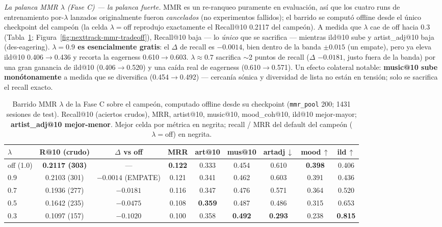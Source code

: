 \documentclass[11pt]{article}
\newcommand{\best}[1]{\textbf{#1}}
\begin{document}
\emph{La palanca MMR $\lambda$ (Fase C) --- la palanca fuerte.} MMR es un re-ranqueo
puramente en evaluación, así que los cuatro runs de entrenamiento por-$\lambda$
lanzados originalmente fueron \emph{cancelados} (no experimentos fallidos); el barrido
se computó offline desde el único checkpoint del campeón (la celda $\lambda{=}$off
reprodujo exactamente el Recall@10 \num{0.2117} del campeón). A medida que $\lambda$ cae
de off hacia \num{0.3} (Tabla~\ref{tab:mmr-sweep}; Figura~\ref{fig:nexttrack-mmr-tradeoff}),
Recall@10 baja --- lo \emph{único} que se sacrifica --- mientras ild@10 sube y
artist\_adj@10 baja (des-eagering). \textbf{$\lambda{=}\num{0.9}$ es esencialmente
gratis}: el $\Delta$ de recall es $-\num{0.0014}$, bien dentro de la banda
$\pm\num{0.015}$ (un empate), pero ya eleva ild@10 \num{0.406}$\to$\num{0.436} y recorta
la eagerness \num{0.610}$\to$\num{0.603}. \textbf{$\lambda\approx\num{0.7}$} sacrifica
$\sim$2 puntos de recall ($\Delta$ $-\num{0.0181}$, justo fuera de la banda) por una
gran ganancia de ild@10 (\num{0.406}$\to$\num{0.520}) y una caída real de eagerness
(\num{0.610}$\to$\num{0.571}). Un efecto colateral notable: \textbf{music@10 sube
monótonamente} a medida que se diversifica (\num{0.454}$\to$\num{0.492}) --- cercanía
sónica y diversidad de lista no están en tensión; solo se sacrifica el recall exacto.

\begin{table}[ht]
  \centering
  \caption{Barrido MMR $\lambda$ de la Fase C sobre el campeón, computado offline desde
  su checkpoint (\texttt{mmr\_pool} \num{200}; \num{1431} sesiones de test). Recall@10
  (aciertos crudos), MRR, artist@10, music@10, mood\_coh@10, ild@10 mejor-mayor;
  \textbf{artist\_adj@10 mejor-menor}. Mejor celda por métrica en negrita; recall / MRR
  del default del campeón ($\lambda{=}$off) en negrita.}
  \label{tab:mmr-sweep}
  {\footnotesize\setlength{\tabcolsep}{4pt}\begin{tabular}{lcccccccc}
    \toprule
    $\lambda$ & R@10 (crudo) & $\Delta$ vs off & MRR & art@10 & mus@10 & artadj\,$\downarrow$ & mood\,$\uparrow$ & ild\,$\uparrow$ \\
    \midrule
    off (1.0) & \best{0.2117 (303)} & --- & \best{0.122} & 0.333 & 0.454 & 0.610 & \best{0.398} & 0.406 \\
    0.9 & 0.2103 (301) & $-0.0014$ (EMPATE) & 0.121 & 0.341 & 0.462 & 0.603 & 0.391 & 0.436 \\
    0.7 & 0.1936 (277) & $-0.0181$ & 0.116 & 0.347 & 0.476 & 0.571 & 0.364 & 0.520 \\
    0.5 & 0.1642 (235) & $-0.0475$ & 0.108 & \best{0.359} & 0.487 & 0.486 & 0.315 & 0.653 \\
    0.3 & 0.1097 (157) & $-0.1020$ & 0.100 & 0.358 & \best{0.492} & \best{0.293} & 0.238 & \best{0.815} \\
    \bottomrule
  \end{tabular}}
\end{table}
\end{document}
